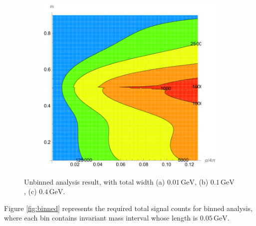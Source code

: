\documentclass[10pt]{article}
\theoremstyle{definition}
\theoremstyle{remark}
\begin{document}
\begin{figure}[h]
\begin{subfigure}{0.3\textwidth}
			\caption{}
		\end{subfigure}
		\begin{subfigure}{0.3\textwidth}
			\centering
			\includegraphics[width=\textwidth]{unbinned_0.4GeV.pdf}
			\caption{}
		\end{subfigure}
		\caption{Unbinned analysis result, with total width (a) $0.01\,\mathrm{GeV}$, (b) $0.1\,\mathrm{GeV}$, (c) $0.4\,\mathrm{GeV}$.}
		\label{fig:unbinned}
	\end{figure}
	
	Figure \ref{fig:binned} represents the required total signal counts for binned analysis, where each bin contains invariant mass interval whose length is $0.05\,\mathrm{GeV}$.
	
\end{document}

